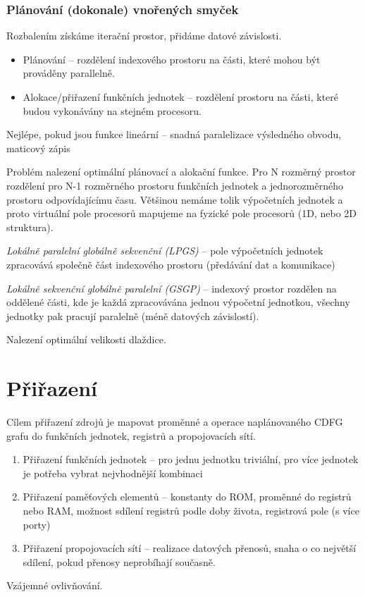 \documentclass[a4paper, 11pt]{report}
\begin{document}
\subsubsection{Plánování (dokonale) vnořených smyček}
Rozbalením získáme iterační prostor, přidáme datové závislosti.
\begin{itemize}
	\item Plánování -- rozdělení indexového prostoru na části, které mohou být prováděny parallelně.
	\item Alokace/přiřazení funkčních jednotek -- rozdělení prostoru na části, které budou vykonávány na stejném procesoru.
\end{itemize}
Nejlépe, pokud jsou funkce lineární -- snadná paralelizace výsledného obvodu, maticový zápis

Problém nalezení optimální plánovací a alokační funkce. Pro N rozměrný prostor rozdělení pro N-1 rozměrného prostoru funkčních jednotek a jednorozměrného prostoru odpovídajícímu času.
Většinou nemáme tolik výpočetních jednotek a proto virtuální pole procesorů mapujeme na fyzické pole procesorů (1D, nebo 2D struktura).

\emph{Lokálně paralelní globálně sekvenční (LPGS)} -- pole výpočetních jednotek zpracovává společně část indexového prostoru (předávání dat a komunikace)

\emph{Lokálně sekvenční globálně paralelní (GSGP)} -- indexový prostor rozdělen na oddělené části, kde je každá zpracovávána jednou výpočetní jednotkou, všechny jednotky pak pracují paralelně (méně datových závislostí).

Nalezení optimální velikosti dlaždice.

\section{Přiřazení}
Cílem přiřazení zdrojů je mapovat proměnné a operace naplánovaného CDFG grafu do funkčních jednotek, registrů a propojovacích sítí.
\begin{enumerate}
	\item Přiřazení funkčních jednotek -- pro jednu jednotku triviální, pro více jednotek je potřeba vybrat nejvhodnější kombinaci
	\item Přiřazení paměťových elementů -- konstanty do ROM, proměnné do registrů nebo RAM, možnost sdílení registrů podle doby života, registrová pole (s více porty)
	\item Přiřazení propojovacích sítí -- realizace datových přenosů, snaha o co největší sdílení, pokud přenosy neprobíhají současně.
\end{enumerate}
Vzájemné ovlivňování.
\end{document}
